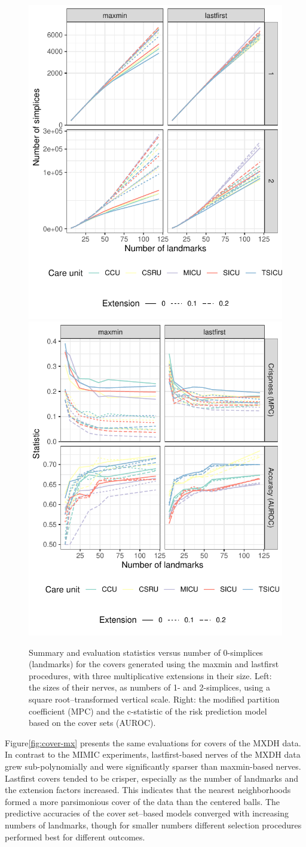 \documentclass{article}
\begin{document}
\begin{figure}
\includegraphics[width=.5\textwidth]{cover-simplices}
\includegraphics[width=.5\textwidth]{cover-evaluate}
\caption{
Summary and evaluation statistics versus number of 0-simplices (landmarks) for the covers generated using the maxmin and lastfirst procedures, with three multiplicative extensions in their size.
Left: the sizes of their nerves, as numbers of 1- and 2-simplices, using a square root--transformed vertical scale.
Right: the modified partition coefficient (MPC) and the c-statistic of the risk prediction model based on the cover sets (AUROC).
\label{fig:cover-mimic}
}
\end{figure}

Figure\nbs\ref{fig:cover-mx} presents the same evaluations for covers of
the MXDH data. In contrast to the MIMIC experiments, lastfirst-based
nerves of the MXDH data grew sub-polynomially and were significantly
sparser than maxmin-based nerves. Lastfirst covers tended to be crisper,
especially as the number of landmarks and the extension factors
increased. This indicates that the nearest neighborhoods formed a more
parsimonious cover of the data than the centered balls. The predictive
accuracies of the cover set--based models converged with increasing
numbers of landmarks, though for smaller numbers different selection
procedures performed best for different outcomes.
\end{document}
